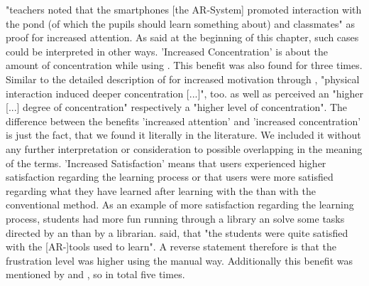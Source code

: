 "teachers noted that the smartphones [the AR-System] promoted interaction with the pond (of which the pupils should learn something about) and classmates"\autocite[et.al.][552]{Kamarainen.2013} as proof for 
increased attention. As said at the beginning of this chapter, such cases could be interpreted in other ways.
'Increased Concentration' is about the amount of concentration while using \AR \appsns. This benefit was also found for three times. Similar to the detailed description of \cite{Iwata.2011} for increased motivation through \AR \appns, "physical interaction
induced deeper concentration [...]", too\autocite[9]{Iwata.2011}. \cite{Yen.2013} as well as \cite{Ibanez.2014} perceived an "higher [...] degree of concentration"\autocite[173]{Yen.2013} respectively a 
"higher level of concentration"\autocite[11]{Ibanez.2014}. The difference between the benefits 'increased attention' and 'increased concentration' is just the fact, that we found it literally in the literature. We included it
without any further interpretation or consideration to possible overlapping in the meaning of the terms.
'Increased Satisfaction' means that users experienced higher satisfaction regarding the learning process or that users were more satisfied regarding what they have learned after learning with the \AR \app than with the 
conventional method. As an example of more satisfaction regarding the learning process, students had more fun running through a library an solve some tasks directed by an \AR \app than by a librarian\autocite[649]{Chen.2012}.
\cite{MartinGutierrez.2013} said, that "the students were quite satisfied with the [AR-]tools used to learn"\autocite[6]{MartinGutierrez.2013}. A reverse statement therefore is that the frustration level was higher using the 
manual way\autocite[448]{Hou.2013}. Additionally this benefit was mentioned by \cite{Ibanez.2014} and \cite{Redondo.2013}, so in total five times.

% 
